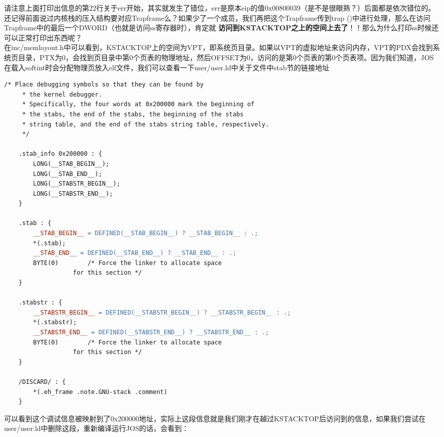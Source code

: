 \documentclass{article}
\newcommand{\highlight}[1]{{\bfseries \color{red}  #1}}
\begin{document}
\begin{CJK*}{UTF8}{gkai}
\begin{enumerate}
{请注意上面打印出信息的第22行关于err开始，其实就发生了错位，err是原本eip的值0x00800039（是不是很眼熟？）后面都是依次错位的。 \\

还记得前面说过内核栈的压入结构要对应Trapframe么？如果少了一个成员，我们再把这个Trapframe传到trap ()中进行处理，那么在访问Trapframe中的最后一个DWORD（也就是访问ss寄存器时），肯定就\highlight{访问到KSTACKTOP之上的空间上去了}！！那么为什么打印ss时候还可以正常打印出东西呢？\\

在inc/memlayout.h中可以看到，KSTACKTOP上的空间为VPT，即系统页目录。如果以VPT的虚拟地址来访问内存，VPT的PDX会找到系统页目录，PTX为0，会找到页目录中第0个页表的物理地址，然后OFFSET为0，访问的是第0个页表的第0个页表项。因为我们知道，JOS在载入softint时会分配物理页放入elf文件，我们可以查看一下user/user.ld中关于文件中stab节的链接地址

\begin{lstlisting}[style=ccode, language=make, firstnumber=39, title={\scriptsize \ttfamily \bfseries user/user.ld}]
    /* Place debugging symbols so that they can be found by
     * the kernel debugger.
     * Specifically, the four words at 0x200000 mark the beginning of
     * the stabs, the end of the stabs, the beginning of the stabs
     * string table, and the end of the stabs string table, respectively.
     */

    .stab_info 0x200000 : {
        LONG(__STAB_BEGIN__);
        LONG(__STAB_END__);
        LONG(__STABSTR_BEGIN__);
        LONG(__STABSTR_END__);
    }

    .stab : {
        __STAB_BEGIN__ = DEFINED(__STAB_BEGIN__) ? __STAB_BEGIN__ : .;
        *(.stab);
        __STAB_END__ = DEFINED(__STAB_END__) ? __STAB_END__ : .;
        BYTE(0)        /* Force the linker to allocate space
                   for this section */
    }

    .stabstr : {
        __STABSTR_BEGIN__ = DEFINED(__STABSTR_BEGIN__) ? __STABSTR_BEGIN__ : .;
        *(.stabstr);
        __STABSTR_END__ = DEFINED(__STABSTR_END__) ? __STABSTR_END__ : .;
        BYTE(0)        /* Force the linker to allocate space
                   for this section */
    }

    /DISCARD/ : {
        *(.eh_frame .note.GNU-stack .comment)
    }
\end{lstlisting}

可以看到这个调试信息被映射到了0x200000地址，实际上这段信息就是我们刚才在越过KSTACKTOP后访问到的信息，如果我们尝试在user/user.ld中删除这段，重新编译运行JOS的话，会看到：

}
\end{enumerate}
\end{CJK*}
\end{document}
